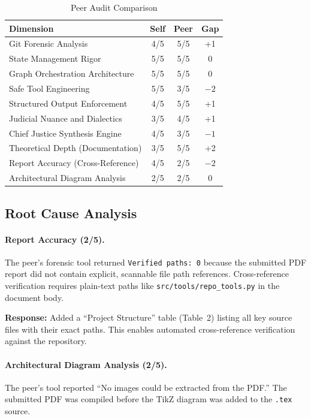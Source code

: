 \documentclass[11pt,a4paper]{article}
\begin{document}
\begin{table}[H]
\centering
\caption{Peer Audit Comparison}
\begin{tabular}{@{}lccc@{}}
\toprule
\textbf{Dimension} & \textbf{Self} & \textbf{Peer} & \textbf{Gap} \\
\midrule
Git Forensic Analysis            & 4/5 & 5/5 & +1 \\
State Management Rigor           & 5/5 & 5/5 & 0 \\
Graph Orchestration Architecture & 5/5 & 5/5 & 0 \\
Safe Tool Engineering            & 5/5 & 3/5 & $-2$ \\
Structured Output Enforcement    & 4/5 & 5/5 & +1 \\
Judicial Nuance and Dialectics   & 3/5 & 4/5 & +1 \\
Chief Justice Synthesis Engine   & 4/5 & 3/5 & $-1$ \\
Theoretical Depth (Documentation)& 3/5 & 5/5 & +2 \\
Report Accuracy (Cross-Reference)& 4/5 & 2/5 & $-2$ \\
Architectural Diagram Analysis   & 2/5 & 2/5 & 0 \\
\bottomrule
\end{tabular}
\end{table}

\subsection{Root Cause Analysis}

\paragraph{Report Accuracy (2/5).}
The peer's forensic tool returned \texttt{Verified paths: 0} because the
submitted PDF report did not contain explicit, scannable file path references.
Cross-reference verification requires plain-text paths like
\texttt{src/tools/repo\_tools.py} in the document body.

\textbf{Response:} Added a ``Project Structure'' table (Table~2) listing all
key source files with their exact paths. This enables automated cross-reference
verification against the repository.

\paragraph{Architectural Diagram Analysis (2/5).}
The peer's tool reported ``No images could be extracted from the PDF.''
The submitted PDF was compiled before the TikZ diagram was added to the
\texttt{.tex} source.
\end{document}
